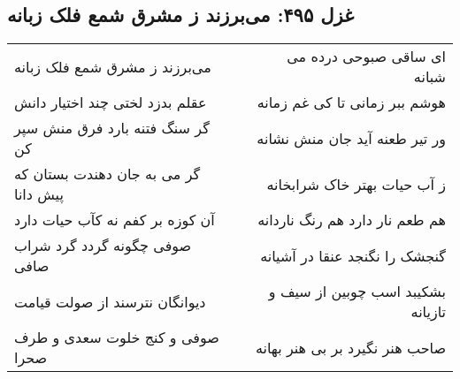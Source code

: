 \begin{center}
\section*{غزل ۴۹۵: می‌برزند ز مشرق شمع فلک زبانه}
\label{sec:495}
\begin{longtable}{l p{0.5cm} r}
می‌برزند ز مشرق شمع فلک زبانه
&&
ای ساقی صبوحی درده می شبانه
\\
عقلم بدزد لختی چند اختیار دانش
&&
هوشم ببر زمانی تا کی غم زمانه
\\
گر سنگ فتنه بارد فرق منش سپر کن
&&
ور تیر طعنه آید جان منش نشانه
\\
گر می به جان دهندت بستان که پیش دانا
&&
ز آب حیات بهتر خاک شرابخانه
\\
آن کوزه بر کفم نه کآب حیات دارد
&&
هم طعم نار دارد هم رنگ ناردانه
\\
صوفی چگونه گردد گرد شراب صافی
&&
گنجشک را نگنجد عنقا در آشیانه
\\
دیوانگان نترسند از صولت قیامت
&&
بشکیبد اسب چوبین از سیف و تازیانه
\\
صوفی و کنج خلوت سعدی و طرف صحرا
&&
صاحب هنر نگیرد بر بی هنر بهانه
\\
\end{longtable}
\end{center}

